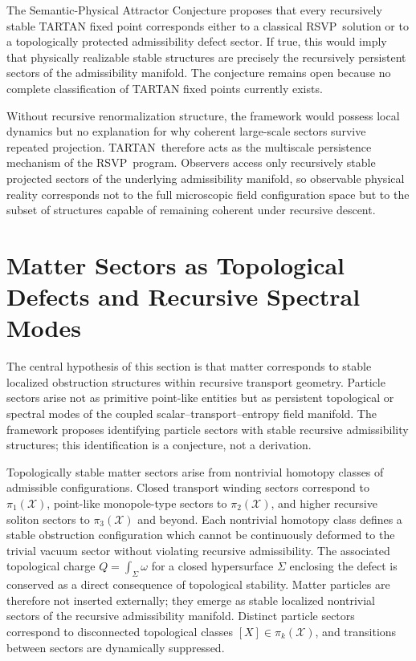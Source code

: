 \documentclass[12pt,a4paper]{article}
\newcommand{\RSVP}{\textrm{RSVP}}
\newcommand{\TARTAN}{\textrm{TARTAN}}
\newcommand{\Field}{\mathcal{X}}
\begin{document}
The Semantic-Physical Attractor Conjecture proposes that every recursively
stable TARTAN fixed point corresponds either to a classical \RSVP\ solution or
to a topologically protected admissibility defect sector. If true, this would
imply that physically realizable stable structures are precisely the recursively
persistent sectors of the admissibility manifold. The conjecture remains open
because no complete classification of TARTAN fixed points currently exists.

Without recursive renormalization structure, the framework would possess local
dynamics but no explanation for why coherent large-scale sectors survive
repeated projection. \TARTAN\ therefore acts as the multiscale persistence
mechanism of the \RSVP\ program. Observers access only recursively stable
projected sectors of the underlying admissibility manifold, so observable
physical reality corresponds not to the full microscopic field configuration
space but to the subset of structures capable of remaining coherent under
recursive descent.

\section{Matter Sectors as Topological Defects and Recursive Spectral Modes}

The central hypothesis of this section is that matter corresponds to stable
localized obstruction structures within recursive transport geometry. Particle
sectors arise not as primitive point-like entities but as persistent topological
or spectral modes of the coupled scalar--transport--entropy field manifold. The
framework proposes identifying particle sectors with stable recursive
admissibility structures; this identification is a conjecture, not a derivation.

Topologically stable matter sectors arise from nontrivial homotopy classes of
admissible configurations. Closed transport winding sectors correspond to
$\pi_1(\Field)$, point-like monopole-type sectors to $\pi_2(\Field)$, and
higher recursive soliton sectors to $\pi_3(\Field)$ and beyond. Each nontrivial
homotopy class defines a stable obstruction configuration which cannot be
continuously deformed to the trivial vacuum sector without violating recursive
admissibility. The associated topological charge
$Q=\int_\Sigma\omega$ for a closed hypersurface $\Sigma$ enclosing the defect
is conserved as a direct consequence of topological stability. Matter particles
are therefore not inserted externally; they emerge as stable localized
nontrivial sectors of the recursive admissibility manifold. Distinct particle
sectors correspond to disconnected topological classes $[X]\in\pi_k(\Field)$,
and transitions between sectors are dynamically suppressed.
\end{document}
